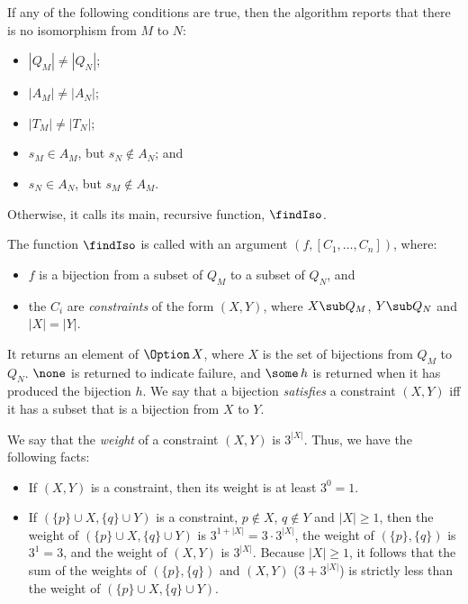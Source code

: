 If any of the following conditions are true, then the algorithm reports
that there is no isomorphism from $M$ to $N$:
\begin{itemize}
\item $|Q_M|\neq|Q_N|$;

\item $|A_M|\neq|A_N|$;

\item $|T_M|\neq|T_N|$;

\item $s_M\in A_M$, but $s_N\not\in A_N$; and

\item $s_N\in A_N$, but $s_M\not\in A_M$.
\end{itemize}
Otherwise, it calls its main, recursive function, $\findIso$.

The function $\findIso$ is called with an argument $(f,
[C_1,\ldots,C_n])$, where:
\begin{itemize}
\item $f$ is a bijection from a subset of $Q_M$ to a subset of $Q_N$, and

\item the $C_i$ are \emph{constraints} of the form $(X,Y)$, where
  $X\sub Q_M$, $Y\sub Q_N$ and $|X|=|Y|$.
\end{itemize}
It returns an element of $\Option\,X$, where $X$ is the set of
bijections from $Q_M$ to $Q_N$.  $\none$ is returned to indicate
failure, and $\some\,h$ is returned when it has produced the bijection $h$.
We say that a bijection \emph{satisfies} a constraint $(X,Y)$ iff it
has a subset that is a bijection from $X$ to $Y$.

We say that the \emph{weight} of a constraint $(X,Y)$ is $3^{|X|}$.
Thus, we have the following facts:
\begin{itemize}
\item If $(X,Y)$ is a constraint, then its weight is at least $3^0=1$.

\item If $(\{p\}\cup X,\{q\}\cup Y)$ is a constraint, $p\not\in X$,
  $q\not\in Y$ and $|X|\geq 1$, then the weight of $(\{p\}\cup
  X,\{q\}\cup Y)$ is $3^{1+|X|}=3\cdot 3^{|X|}$, the weight of
  $(\{p\},\{q\})$ is $3^1=3$, and the weight of $(X,Y)$ is $3^{|X|}$.
  Because $|X|\geq 1$, it follows that the sum of the weights of
  $(\{p\},\{q\})$ and $(X,Y)$ ($3 + 3^{|X|}$) is strictly less than
  the weight of $(\{p\}\cup X,\{q\}\cup Y)$.
\end{itemize}

